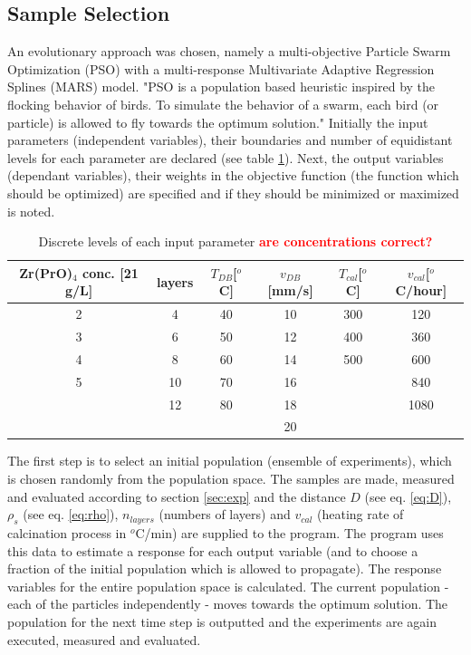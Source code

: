 \documentclass[a4paper]{article}
\newcommand{\td}[1]{\textbf{\textcolor{red}{#1}}}
\begin{document}
\subsection{Sample Selection}
\label{sec:ss}
An evolutionary approach was chosen, namely a multi-objective Particle Swarm Optimization (PSO) with a multi-response
Multivariate Adaptive Regression Splines (MARS) model\cite{Villanova2010,Kennedy1995,Breiman1997,Carta2011}.
%
"PSO is a population based heuristic inspired by the flocking behavior of birds. 
To simulate the behavior of a swarm, each bird (or particle) is allowed to fly towards the optimum solution."\cite{Villanova2010}
%
Initially the input parameters (independent variables), their boundaries and number of equidistant levels for each parameter are declared (see table \ref{tab:input}).
Next, the output variables (dependant variables), their weights in the objective function (the function which should be optimized) are specified and if they should be minimized or maximized is noted.
%
\begin{table}[htb]
	\centering
	\begin{tabular}{cc cc cc}
		\hline
		Zr(PrO)$_4$ conc. [21 g/L]	&layers	&$T_{DB}$[$^o$C]	&$v_{DB}$[mm/s]	&$T_{cal}$[$^o$C]	&$v_{cal}$[$^o$C/hour]	\\
		\hline
		2				&4		&40					&10				&300				&120	\\
		3				&6		&50					&12				&400				&360	\\
		4				&8		&60					&14				&500				&600	\\
		5				&10		&70					&16				&					&840	\\
						&12		&80					&18				&					&1080	\\
						&		&					&20				&					&		\\
		\hline
	\end{tabular}
	\caption{Discrete levels of each input parameter \td{are concentrations correct?}}
	\label{tab:input}
\end{table}

The first step is to select an initial population (ensemble of experiments), which is chosen randomly from the population space. 
The samples are made, measured and evaluated according to section \ref{sec:exp} and the distance $D$ (see eq. \ref{eq:D}), $\rho_s$ (see eq. \ref{eq:rho}), $n_{layers}$ (numbers of layers) and $v_{cal}$ (heating rate of calcination process in $^o$C/min) are supplied to the program. 
The program uses this data to estimate a response for each output variable (and to choose a fraction of the initial population which is allowed to propagate).
The response variables for the entire population space is calculated. 
The current population - each of the particles independently - moves towards the optimum solution.
The population for the next time step is outputted and the experiments are again executed, measured and evaluated.
\end{document}
